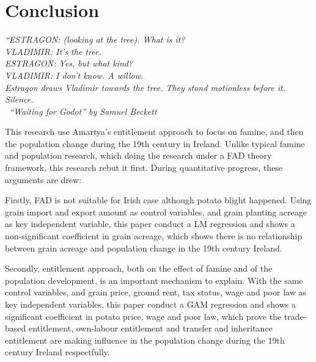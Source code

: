 \chapter{Conclusion}

\textit{
    ``ESTRAGON: (looking at the tree). What is it? \\
    VLADIMIR: It's the tree. \\
    ESTRAGON: Yes, but what kind? \\
    VLADIMIR: I don't know. A willow. \\
    Estragon draws Vladimir towards the tree. They stand 
    motionless before it. Silence. \\
    \textemdash\ ``Waiting for Godot'' by Samuel Beckett
} \citep{beck1982waiting}

This research use Amartya's entitlement approach to focus on famine, and then the population change during the 19th century in Ireland. Unlike typical famine and population research, which doing the research under a FAD theory framework, this research rebut it first. During quantitative progress, these arguments are drew: 

Firstly, FAD is not suitable for Irish case although potato blight happened. Using grain import and export amount as control variables, and grain planting acreage as key independent variable, this paper conduct a LM regression and shows a non-significant coefficient in grain acreage, which shows there is no relationship between grain acreage and population change in the 19th century Ireland.

Secondly, entitlement approach, both on the effect of famine and of the population development, is an important mechanism to explain. With the same control variables, and grain price, ground rent, tax status, wage and poor law as key independent variables, this paper conduct a GAM regression and shows a significant coefficient in potato price, wage and poor law, which prove the trade-based entitlement, own-labour entitlement and transfer and inheritance entitlement are making influence in the population change during the 19th century Ireland respectfully.
